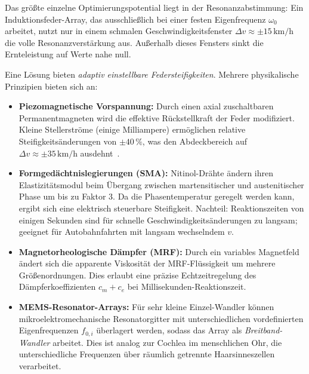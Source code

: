 ﻿\documentclass[12pt, a4paper]{report}
\theoremstyle{definition}
\theoremstyle{remark}
\begin{document}
Das größte einzelne Optimierungspotential liegt in der Resonanzabstimmung:
Ein Induk\-tionsfeder-Array, das ausschließlich bei einer festen Eigenfrequenz
$\omega_0$ arbeitet, nutzt nur in einem schmalen Geschwindigkeitsfenster
$\Delta v \approx \pm 15\,\text{km/h}$ die volle Resonanzverstärkung aus.
Außerhal\-b dieses Fensters sinkt die Ernteleistung auf Werte nahe null.

Eine Lösung bieten \emph{adaptiv einstellbare Federsteifigkeiten}. Mehrere
physikalische Prinzipien bieten sich an:

\begin{itemize}
  \item \textbf{Piezomagnetische Vorspannung:} Durch einen axial zuschaltbaren
        Permanentmagneten wird die effektive Rückstellkraft der Feder modifiziert.
        Kleine Stellerströme (einige Milliampere) ermöglichen relative
        Steifigkeitsänderungen von $\pm 40\,\%$, was den Abdeckbereich auf
        $\Delta v \approx \pm 35\,\text{km/h}$ ausdehnt~\cite{tang2009}.

  \item \textbf{Formgedächtnislegierungen (SMA):} Nitinol-Drähte ändern ihren
        Elastizitätsmodul beim Übergang zwischen martensitischer und
        austenitischer Phase um bis zu Faktor 3. Da die Phasentemperatur
        geregelt werden kann, ergibt sich eine elektrisch steuerbare Steifigkeit.
        Nachteil: Reaktionszeiten von einigen Sekunden sind für schnelle
        Geschwindigkeitsänderungen zu langsam; geeignet für Autobahnfahrten
        mit langsam wechselndem $v$.

  \item \textbf{Magnetorheologische Dämpfer (MRF):} Durch ein variables
        Magnetfeld ändert sich die apparente Viskosität der MRF-Flüssigkeit
        um mehrere Größenordnungen. Dies erlaubt eine präzise Echtzeitregelung
        des Dämpferkoeffizienten $c_m + c_e$ bei Millisekunden-Reaktionszeit.

  \item \textbf{MEMS-Resonator-Arrays:} Für sehr kleine Einzel-Wandler können
        mikro\-elektro\-mechanische Resonatorgitter mit unterschiedlichen
        vordefinierten Eigenfrequenzen $f_{0,i}$ überlagert werden, sodass das
        Array als \emph{Breitband-Wandler} arbeitet. Dies ist analog zur
        Cochlea im menschlichen Ohr, die unterschiedliche Frequenzen über
        räumlich getrennte Haarsinneszellen verarbeitet.
\end{itemize}
\end{document}
